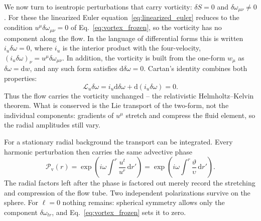 \documentclass[12pt,a4paper,preprint,nopreprintline]{elsarticle}
\begin{document}
We now turn to isentropic perturbations that carry vorticity: $\delta S=0$ and $\delta\omega_{\mu\nu}\neq0$. For these the linearized Euler equation~\eqref{eq:linearized_euler} reduces to the condition $u^{\mu}\delta\omega_{\mu\nu}=0$ of Eq.~\eqref{eq:vortex_frozen}, so the vorticity has no component along the flow. In the language of differential forms this is written $i_{u}\delta\omega=0$, where $i_{u}$ is the interior product with the four-velocity, $(i_{u}\delta\omega)_{\nu}=u^{\mu}\delta\omega_{\mu\nu}$. In addition, the vorticity is built from the one-form $w_{\mu}$ as $\delta\omega=\mathrm{d}w$, and any such form satisfies $\mathrm{d}\delta\omega=0$. Cartan's identity combines both properties:
\begin{equation}
    \mathcal{L}_{u}\delta\omega
    =
    i_{u}\mathrm{d}\delta\omega
    +
    \mathrm{d}(i_{u}\delta\omega)
    =0.
    \label{eq:vorticity_lie_dragged}
\end{equation}
Thus the flow carries the vorticity unchanged -- the relativistic Helmholtz--Kelvin theorem. What is conserved is the Lie transport of the two-form, not the individual components: gradients of $u^{\mu}$ stretch and compress the fluid element, so the radial amplitudes still vary.

For a stationary radial background the transport can be integrated. Every harmonic perturbation then carries the same advective phase
\begin{equation}
    \mathcal{P}_{\mathrm{v}}(r)
    =
    \exp\left(
        i\omega\int^{r}\frac{u^{t}}{u^{r}}\,\mathrm{d}r'
    \right)
    =
    \exp\left(
        i\omega\int^{r}\frac{\vartheta}{\upsilon}\,\mathrm{d}r'
    \right).
    \label{eq:vortex_advection_phase}
\end{equation}
The radial factors left after the phase is factored out merely record the stretching and compression of the flow tube. Two independent polarizations survive on the sphere. For $\ell=0$ nothing remains: spherical symmetry allows only the component $\delta\omega_{tr}$, and Eq.~\eqref{eq:vortex_frozen} sets it to zero.
\end{document}
